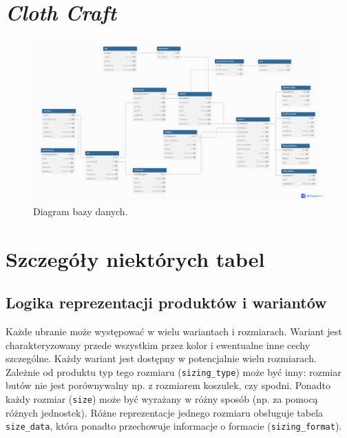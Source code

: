 




\section*{\textit{Cloth Craft}}

\begin{figure}[h] %
    \centering %
    \includegraphics[width=1.0\textwidth]{diagram.png} %
    \caption{Diagram bazy danych.} %
    \label{fig:example} %
\end{figure}

\section*{Szczegóły niektórych tabel}

\subsection*{Logika reprezentacji produktów i wariantów}
Każde ubranie może występować w wielu wariantach i rozmiarach. Wariant jest charakteryzowany przede wszystkim przez kolor i ewentualne inne cechy szczególne. Każdy wariant jest dostępny w potencjalnie wielu rozmiarach. Zależnie od produktu typ tego rozmiaru (\texttt{sizing\_type}) może być inny: rozmiar butów nie jest porównywalny np. z rozmiarem koszulek, czy spodni. Ponadto każdy rozmiar (\texttt{size}) może być wyrażany w różny sposób (np. za pomocą różnych jednostek). Różne reprezentacje jednego rozmiaru obsługuje tabela \texttt{size\_data}, która ponadto przechowuje informacje o formacie (\texttt{sizing\_format}).

